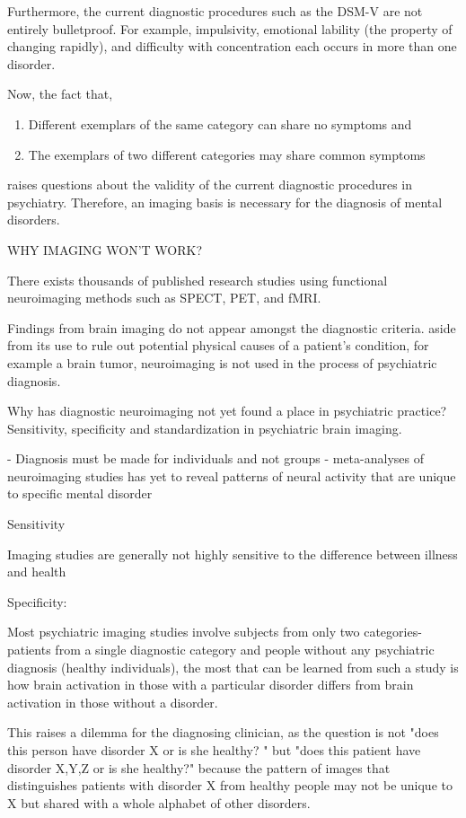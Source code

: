 \documentclass{article}
\begin{document}
Furthermore, the current diagnostic procedures such as the DSM-V are
not entirely bulletproof. For example, impulsivity, emotional lability
(the property of changing rapidly), and difficulty with concentration
each occurs in more than one disorder.

Now, the fact that,

\begin{enumerate}
  \item Different exemplars of the same category can share no
    symptoms and
  \item The exemplars of two different categories may share common
    symptoms
\end{enumerate}

raises questions about the validity of the current diagnostic
procedures in psychiatry. Therefore, an imaging basis is necessary for
the diagnosis of mental disorders.

WHY IMAGING WON'T WORK?

There exists thousands of published research studies using
functional neuroimaging methods such as SPECT, PET, and fMRI.

Findings from brain imaging do not appear amongst the diagnostic
criteria. aside from its use to rule out potential physical causes
of a patient's condition, for example a brain tumor, neuroimaging
is not used in the process of psychiatric diagnosis.

Why has diagnostic neuroimaging not yet found a place in
psychiatric practice? Sensitivity, specificity and standardization
in psychiatric brain imaging.

    - Diagnosis must be made for individuals and not groups
    - meta-analyses of neuroimaging studies has yet to reveal
      patterns of neural activity that are unique to specific
      mental disorder

Sensitivity

Imaging studies are generally not highly sensitive to the
difference between illness and health

Specificity:

Most psychiatric imaging studies involve subjects from only two
categories- patients from a single diagnostic category and people
without any psychiatric diagnosis (healthy individuals), the most
that can be learned from such a study is how brain activation in
those with a particular disorder differs from brain activation in
those without a disorder.

This raises a dilemma for the diagnosing clinician, as the
question is not "does this person have disorder X or is she
healthy? " but "does this patient have disorder X,Y,Z or is she
healthy?" because the pattern of images that distinguishes
patients with disorder X from healthy people may not be unique to
X but shared with a whole alphabet of other disorders.
\end{document}
